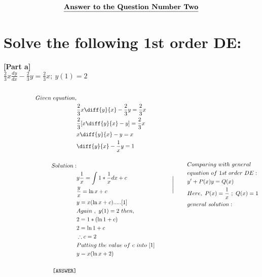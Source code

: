 \documentclass{article}
\newcommand\tab[1][1cm]{\hspace*{#1}}
\begin{document}
\begin{homeworkProblem}
    \[      \textbf{\underline{Answer to the Question Number Two}}
    \]
    \section{Solve the following 1st order DE:}
\textbf{[Part a]}\\
 \tab $\frac{2}{3}x\frac{dy}{dx}-{\frac{2}{3}y = \frac{2}{3}x} ; \ y(1)=2 $\\
 \vspace{5mm}\\
\begin{equation*}
\begin{aligned}
Given \ equation, \\
   &  \frac{2}{3}x\diff{y}{x}-{\frac{2}{3}y = \frac{2}{3}x}\\
   & \frac{2}{3}[x\diff{y}{x}-y] = \frac{2}{3}x\\
   & x\diff{y}{x}-y = x\\
   & \diff{y}{x}-\frac{1}{x}y = 1\\
   \\ 
   Solution:  \\
   & y \frac{1}{x} = \int 1* \frac{1}{x} dx + c\\
   & \frac{y}{x} = \ln x + c\\
   & y = x (\ln x + c ).....[1]\\
   &Again\ ,\ y(1)=2 \ then, \\ 
  & 2 = 1 * (\ln 1 + c)\\
   &2 = \ln 1 + c\\
   & \therefore c = 2\\
   & Putting\ the\ value\ of\ c\ into\ [1]\\
   & y = x(\ln x+2)\\
   \vspace{3mm}\\
\tab\tab\tab\texttt{[ANSWER]}
 \end{aligned}
 \qquad\Bigg\vert\qquad
 \begin{aligned}
  & Comparing\ with\ general\\\
  & equation\ of\ 1st\ order\ DE : \\ 
  & y' + P(x) y = Q(x)\\
 & Here,\ P(x) = \frac{1}{x}\ ; \ Q(x) = 1\\ 
 & general\ solution:\\ 

\end{aligned}
\end{equation*}
\end{homeworkProblem}
\end{document}
